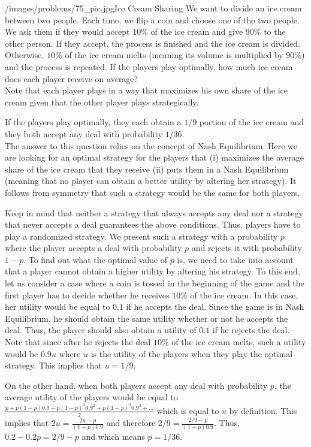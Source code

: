 \begin{problem}{/images/problems/75_pic.jpg}{Ice Cream Sharing} We want to divide an ice cream between two people. Each time, we flip a coin and choose one of the two people. We ask them if they would accept $10\%$ of the ice cream and give $90\%$ to the other person. If they accept, the process is finished and the ice cream is divided. Otherwise, $10\%$ of the ice cream melts (meaning its volume is multiplied by $90\%$) and the process is repeated. If the players play optimally, how much ice cream does each player receive on average?\\[0.2cm]
	
Note that each player plays in a way that maximizes his own share of the ice cream given that the other player plays strategically.
\end{problem}
\begin{solution}
If the players play optimally, they each obtain a $1/9$ portion of the ice cream and they both accept any deal with probability $1/36$.\\[0.2cm]

The answer to this question relies on the concept of Nash Equilibrium. Here we are looking for an optimal strategy for the players that (i) maximizes the average share of the ice cream that they receive (ii) puts them in a Nash Equilibrium (meaning that no player can obtain a better utility by altering her strategy). It follows from symmetry that such a strategy would be the same for both players.

Keep in mind that neither a strategy that always accepts any deal nor a strategy that never accepts a deal guarantees the above conditions. Thus, players have to play a randomized strategy. We present such a strategy with a probability $p$ where the player accepts a deal with probability $p$ and rejects it with probability $1-p$. To find out what the optimal value of $p$ is, we need to take into account that a player cannot obtain a higher utility by altering his strategy. To this end, let us consider a case where a coin is tossed in the beginning of the game and the first player has to decide whether he receives $10\%$ of the ice cream. In this case, her utility would be equal to $0.1$ if he accepts the deal. Since the game is in Nash Equilibrium, he should obtain the same utility whether or not he accepts the deal. Thus, the player should also obtain a utility of $0.1$ if he rejects the deal. Note that since after he rejects the deal $10\%$ of the ice cream melts, such a utility would be $0.9u$ where $u$ is the utility of the players when they play the optimal strategy. This implies that $u = 1/9$.

On the other hand, when both players accept any deal with probability $p$, the average utility of the players would be equal to $\frac{p + p(1-p)  0.9 + p(1-p)^2 0.9^2 + p(1-p)^3 0.9^3 + \ldots}{2}$ which is equal to $u$ by definition. This implies that $2u = \frac{2u-p}{(1-p)0.9}$ and therefore $2/9 = \frac{2/9 - p}{(1-p)0.9}$. Thus, $0.2 - 0.2 p = 2/9 - p$ and which means $p = 1/36$.

\end{solution}

